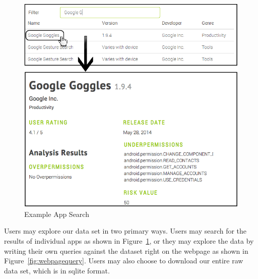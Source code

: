 \documentclass{sig-alternate-05-2015}
\begin{document}


\begin{figure}[h]
\centering
\includegraphics[scale=0.4]{images/Google_Googles_ICSE.png}
\caption{Example App Search}
\label{fig:appSearch_all}
\end{figure}




Users may explore our data set in two primary ways. Users may search for the results of individual apps as shown in Figure~\ref{fig:appSearch_all}, or they may explore the data by writing their own queries against the dataset right on the webpage as shown in Figure~\ref{fig:webpagequery}. Users may also choose to download our entire raw data set, which is in sqlite format.
%



%
\end{document}
